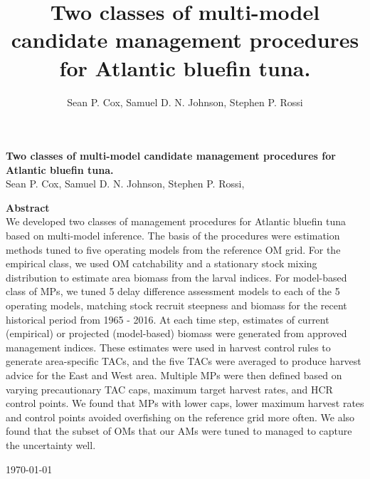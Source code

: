 \documentclass[]{article}
\title{Two classes of multi-model candidate management procedures for Atlantic bluefin tuna.}
\author{Sean P. Cox, Samuel D. N. Johnson, Stephen P. Rossi}
\date{}
\begin{document}


\begin{titlepage}

\begin{flushleft}


\noindent
\textbf{Two classes of multi-model candidate management procedures for Atlantic bluefin tuna.}\\[0.2in]

{Sean P. Cox, Samuel D. N. Johnson, Stephen P. Rossi, }

\vspace{0.2in}

\vspace{0.2in}

\textbf{Abstract} \\
We developed two classes of management procedures for Atlantic bluefin tuna based on multi-model inference. The basis of the procedures were estimation methods tuned to five operating models from the reference OM grid. For the empirical class, we used OM catchability and a stationary stock mixing distribution to estimate area biomass from the larval indices. For model-based class of MPs, we tuned 5 delay difference assessment models to each of the 5 operating models, matching stock recruit steepness and biomass for the recent historical period from 1965 - 2016. At each time step, estimates of current (empirical) or projected (model-based) biomass were generated from approved management indices. These estimates were used in harvest control rules to generate area-specific TACs, and the five TACs were averaged to produce harvest advice for the East and West area. Multiple MPs were then defined based on varying precautionary TAC caps, maximum target harvest rates, and HCR control points. We found that MPs with lower caps, lower maximum harvest rates and control points avoided overfishing on the reference grid more often. We also found that the subset of OMs that our AMs were tuned to managed to capture the uncertainty well. \\[0.2in]
\end{flushleft}

\today

\end{titlepage}

\setcounter{page}{2}





\newpage
\end{document}
